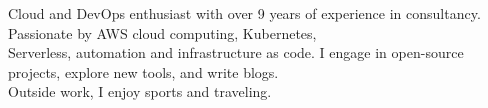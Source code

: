 

\begin{cvparagraph}

Cloud and DevOps enthusiast with over 9 years of experience in consultancy.
Passionate by AWS cloud computing, Kubernetes,\\ Serverless, automation and infrastructure as code. 
I engage in open-source projects, explore new tools, and write blogs.\\
Outside work, I enjoy sports and traveling.
\end{cvparagraph}
